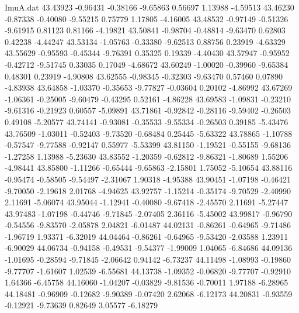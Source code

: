 \begin{filecontents}{ImuA.dat}
  43.43923   -0.96431   -0.38166   -9.65863    0.56697    1.13988   -4.59513
  43.46230   -0.87338   -0.40080   -9.55215    0.75779    1.17805   -4.16005
  43.48532   -0.97149   -0.51326   -9.61915    0.81123    0.81166   -4.19821
  43.50841   -0.98704   -0.48814   -9.63470    0.62803    0.42238   -4.44247
  43.53134   -1.05763   -0.33380   -9.62513    0.88756    0.23919   -4.63329
  43.55629   -0.95593   -0.45344   -9.76391    0.35325    0.19339   -4.40430
  43.57947   -0.95952   -0.42712   -9.51745    0.33035    0.17049   -4.68672
  43.60249   -1.00020   -0.39960   -9.65384    0.48301    0.23919   -4.90808
  43.62555   -0.98345   -0.32303   -9.63470    0.57460    0.07890   -4.83938
  43.64858   -1.03370   -0.35653   -9.77827   -0.03604    0.20102   -4.86992
  43.67269   -1.06361   -0.25005   -9.60479   -0.43295    0.52161   -4.86228
  43.69583   -1.09831   -0.23210   -9.61316   -0.21923    0.60557   -5.09891
  43.71861   -0.92842   -0.28116   -9.59402   -0.26503    0.49108   -5.20577
  43.74141   -0.93081   -0.35533   -9.55334   -0.26503    0.39185   -5.43476
  43.76509   -1.03011   -0.52403   -9.73520   -0.68484    0.25445   -5.63322
  43.78865   -1.10788   -0.57547   -9.77588   -0.92147    0.55977   -5.53399
  43.81150   -1.19521   -0.55155   -9.68136   -1.27258    1.13988   -5.23630
  43.83552   -1.20359   -0.62812   -9.86321   -1.80689    1.55206   -4.98441
  43.85800   -1.11266   -0.65444   -9.65863   -2.15801    1.75052   -5.10654
  43.88116   -0.95474   -0.58505   -9.54497   -2.31067    1.90318   -4.95388
  43.90451   -1.07198   -0.46421   -9.70050   -2.19618    2.01768   -4.94625
  43.92757   -1.15214   -0.35174   -9.70529   -2.40990    2.11691   -5.06074
  43.95044   -1.12941   -0.40080   -9.67418   -2.45570    2.11691   -5.27447
  43.97483   -1.07198   -0.44746   -9.71845   -2.07405    2.36116   -5.45002
  43.99817   -0.96790   -0.54556   -9.83570   -2.05878    2.04821   -6.01487
  44.02131   -0.86261   -0.64965   -9.71486   -1.96719    1.93371   -6.32019
  44.04464   -0.86261   -0.64965   -9.53420   -2.03588    1.23911   -6.90029
  44.06734   -0.94158   -0.49531   -9.54377   -1.99009    1.04065   -6.84686
  44.09136   -1.01695   -0.28594   -9.71845   -2.06642    0.94142   -6.73237
  44.11498   -1.08993   -0.19860   -9.77707   -1.61607    1.02539   -6.55681
  44.13738   -1.09352   -0.06820   -9.77707   -0.92910    1.64366   -6.45758
  44.16060   -1.04207   -0.03829   -9.81536   -0.70011    1.97188   -6.28965
  44.18481   -0.96909   -0.12682   -9.90389   -0.07420    2.62068   -6.12173
  44.20831   -0.93559   -0.12921   -9.73639    0.82649    3.05577   -6.18279

\end{filecontents}
